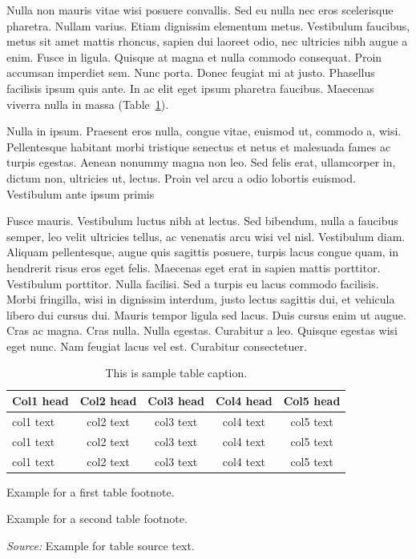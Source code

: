 \documentclass[ASNA,twocolumn]{USG} %
\begin{document}
Nulla non mauris vitae wisi posuere convallis. Sed eu nulla nec eros scelerisque pharetra. Nullam varius. Etiam
dignissim elementum metus. Vestibulum faucibus, metus sit amet mattis rhoncus, sapien dui laoreet odio, nec ultricies
nibh augue a enim. Fusce in ligula. Quisque at magna et nulla commodo consequat. Proin accumsan imperdiet sem.
Nunc porta. Donec feugiat mi at justo. Phasellus facilisis ipsum quis ante. In ac elit eget ipsum pharetra faucibus.
Maecenas viverra nulla in massa (Table~\ref{tab2}).

Nulla in ipsum. Praesent eros nulla, congue vitae, euismod ut, commodo a, wisi. Pellentesque habitant morbi
tristique senectus et netus et malesuada fames ac turpis egestas. Aenean nonummy magna non leo. Sed felis erat,
ullamcorper in, dictum non, ultricies ut, lectus. Proin vel arcu a odio lobortis euismod. Vestibulum ante ipsum primis

Fusce mauris. Vestibulum luctus nibh at lectus. Sed bibendum, nulla a faucibus semper, leo velit ultricies tellus, ac
venenatis arcu wisi vel nisl. Vestibulum diam. Aliquam pellentesque, augue quis sagittis posuere, turpis lacus congue
quam, in hendrerit risus eros eget felis. Maecenas eget erat in sapien mattis porttitor. Vestibulum porttitor. Nulla
facilisi. Sed a turpis eu lacus commodo facilisis. Morbi fringilla, wisi in dignissim interdum, justo lectus sagittis dui, et
vehicula libero dui cursus dui. Mauris tempor ligula sed lacus. Duis cursus enim ut augue. Cras ac magna. Cras nulla.
Nulla egestas. Curabitur a leo. Quisque egestas wisi eget nunc. Nam feugiat lacus vel est. Curabitur consectetuer.

\begin{table}[!t]%
\centering %
\caption{This is sample table caption.\label{tab2}}%
\begin{tabular*}{\textwidth}{@{\extracolsep\fill}lcccc@{\extracolsep\fill}}
\toprule
\textbf{Col1 head} & \textbf{Col2 head}  & \textbf{Col3 head}  & \textbf{Col4 head}  & \textbf{Col5 head} \\
\midrule
col1 text & col2 text  & col3 text  & col4 text  & col5 text\tnote{$^\dagger$}   \\
col1 text & col2 text  & col3 text  & col4 text  & col5 text   \\
col1 text & col2 text  & col3 text  & col4 text  & col5 text\tnote{$^\ddagger$}   \\
\bottomrule
\end{tabular*}
\begin{tablenotes}
\item[$^\dagger$] Example for a first table footnote.
\item[$^\ddagger$] Example for a second table footnote.
\item {\it Source:} Example for table source text.
\end{tablenotes}
\end{table}
\end{document}
